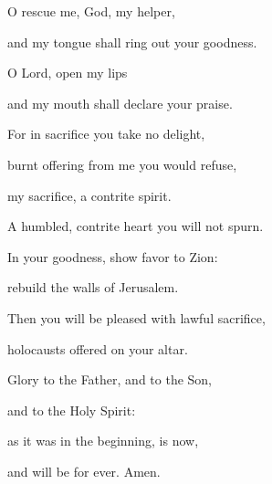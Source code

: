 \noindent O rescue me, God, my helper,~\GreStar{}~\nopagebreak

and my tongue shall ring out your goodness. 

\noindent O Lord, open my lips~\GreStar{}~\nopagebreak

and my mouth shall declare your praise.

\noindent For in sacrifice you take no delight,~\GreStar{}~\nopagebreak

burnt offering from me you would refuse,

\noindent my sacrifice, a contrite spirit.~\GreStar{}~\nopagebreak

A humbled, contrite heart you will not spurn.

\noindent In your goodness, show favor to Zion:~\GreStar{}~\nopagebreak

rebuild the walls of Jerusalem.

\noindent Then you will be pleased with lawful sacrifice,~\GreStar{}~\nopagebreak

holocausts offered on your altar.

\noindent Glory to the Father, and to the Son,~\GreStar{}~\nopagebreak

and to the Holy Spirit:

\noindent as it was in the beginning, is now,~\GreStar{}~\nopagebreak

and will be for ever. Amen.
